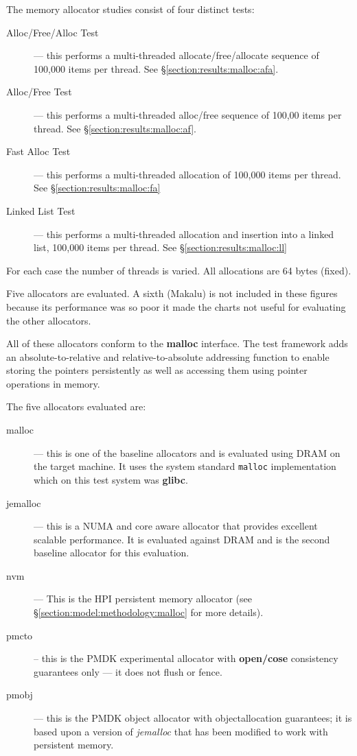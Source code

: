 The memory allocator studies consist of four distinct tests:

\begin{description}
\item[Alloc/Free/Alloc Test] --- this performs a multi-threaded allocate/free/allocate sequence of 100,000 items per thread. See \S \ref{section:results:malloc:afa}.
\item[Alloc/Free Test] --- this performs a multi-threaded alloc/free sequence of 100,00 items per thread. See \S \ref{section:results:malloc:af}.
\item[Fast Alloc Test] --- this performs a multi-threaded allocation of 100,000 items per thread. See \S \ref{section:results:malloc:fa}
\item[Linked List Test] --- this performs a multi-threaded allocation and insertion into a linked list, 100,000 items per thread. See \S \ref{section:results:malloc:ll}
\end{description}

For each case the number of threads is varied.  All allocations are 64 bytes (fixed).

Five allocators are evaluated.  A sixth (Makalu) is not included in these figures because its performance was so poor it made the charts not useful for evaluating the other allocators.

All of these allocators conform to the \textbf{malloc} interface.  The test framework adds an absolute-to-relative and
relative-to-absolute addressing function to enable storing
the pointers persistently as well as accessing them using
pointer operations in memory.

The five allocators evaluated are:

\begin{description}
    \item[malloc] --- this is one of the baseline allocators and is evaluated using DRAM on the target machine.  It uses the system standard \texttt{malloc} implementation which on this test system was \textbf{glibc}.
    \item[jemalloc] --- this is a NUMA and core aware allocator that provides excellent scalable performance.  It is evaluated against DRAM and is the second baseline allocator for this evaluation.
    \item[nvm] --- This is the HPI persistent memory allocator (see \S \ref{section:model:methodology:malloc} for more details).
    \item[pmcto] -- this is the PMDK experimental allocator with \textbf{open/cose} consistency guarantees only --- it does not flush or fence.
    \item[pmobj] --- this is the PMDK object allocator with objectallocation guarantees; it is based upon a version of \textit{jemalloc} that has been modified to work with persistent memory.      
\end{description}

